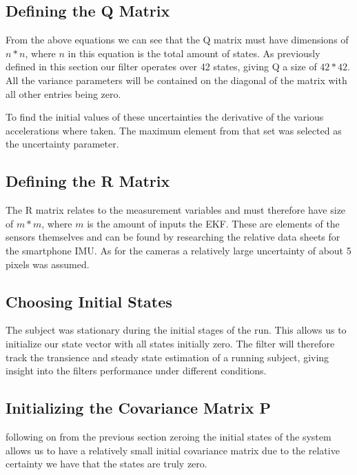 \subsection{Defining the Q Matrix}
From the above equations we can see that the Q matrix must have dimensions of $n*n$, where $n$ in this equation is the total amount of states. As previously defined in this section our filter operates over 42 states, giving Q a size of $42*42$. All the variance parameters will be contained on the diagonal of the matrix with all other entries being zero.

To find the initial values of these uncertainties the derivative of the various accelerations where taken. The maximum element from that set was selected as the uncertainty parameter.

\subsection{Defining the R Matrix}
The R matrix relates to the measurement variables and must therefore have size of $m*m$, where $m$ is the amount of inputs the EKF. These are elements of the sensors themselves and can be found by researching the relative data sheets for the smartphone IMU. As for the cameras a relatively large uncertainty of about 5 pixels was assumed.

\subsection{Choosing Initial States}
The subject was stationary during the initial stages of the run. This allows us to initialize our state vector with all states initially zero. The filter will therefore track the transience and steady state estimation of a running subject, giving insight into the filters performance under different conditions. 


\subsection{Initializing the Covariance Matrix P}
following on from the previous section zeroing the initial states of the system allows us to have a relatively small initial covariance matrix due to the relative certainty we have that the states are truly zero. 


 









